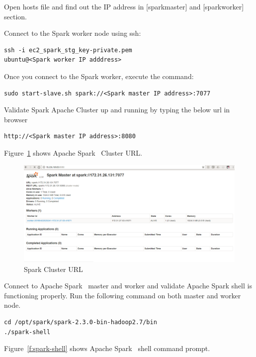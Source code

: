 Open hosts file and find out the IP address in [sparkmaster] and
[sparkworker] section.

Connect to the Spark worker node using ssh:

\begin{verbatim}
ssh -i ec2_spark_stg_key-private.pem 
ubuntu@<Spark worker IP adddress>
\end{verbatim}

Once you connect to the Spark worker, execute the command:

\begin{verbatim}
sudo start-slave.sh spark://<Spark master IP address>:7077
\end{verbatim}

Validate Spark Apache Cluster up and running by typing the below url
in browser

\begin{verbatim}
http://<Spark master IP address>:8080
\end{verbatim}

Figure~\ref{f:spark-cluster-url} shows Apache
Spark~\cite{hid-sp18-511-www-spark} Cluster URL\@.

\begin{figure}[!ht]
\centering\includegraphics[width=\columnwidth]{images/sparkclusterurl.png}
\caption{Spark Cluster URL}\label{f:spark-cluster-url}
\end{figure}

Connect to Apache Spark~\cite{hid-sp18-511-www-spark} master and
worker and validate Apache Spark shell is functioning properly.  Run
the following command on both master and worker node.

\begin{verbatim}
cd /opt/spark/spark-2.3.0-bin-hadoop2.7/bin
./spark-shell 
\end{verbatim}
 
Figure~\ref{f:spark-shell} shows Apache
Spark~\cite{hid-sp18-511-www-spark} shell command prompt.

